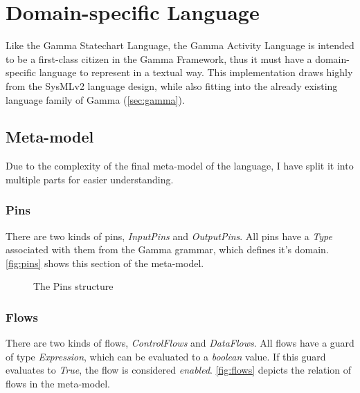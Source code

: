 \clearpage\section{Domain-specific Language}

Like the Gamma Statechart Language, the Gamma Activity Language is intended to be a first-class citizen in the Gamma Framework, thus it must have a domain-specific language to represent in a textual way. This implementation draws highly from the SysMLv2 \cite{omg_sysml_v2} language design, while also fitting into the already existing language family of Gamma (\autoref{sec:gamma}).

\subsection{Meta-model}

Due to the complexity of the final meta-model of the language, I have split it into multiple parts for easier understanding.

\subsubsection{Pins}\label{ssec:pins}

There are two kinds of pins, \emph{InputPins} and \emph{OutputPins}. All pins have a \emph{Type} associated with them from the Gamma grammar, which defines it's domain. \autoref{fig:pins} shows this section of the meta-model.

\begin{figure}[!ht]
	\centering
	
	\caption{The Pins structure}
	\label{fig:pins}
\end{figure}

\subsubsection{Flows}\label{ssec:flows}

There are two kinds of flows, \emph{ControlFlows} and \emph{DataFlows}. All flows have a guard of type \emph{Expression}, which can be evaluated to a \emph{boolean} value. If this guard evaluates to \emph{True}, the flow is considered \emph{enabled}. \autoref{fig:flows} depicts the relation of flows in the meta-model.

